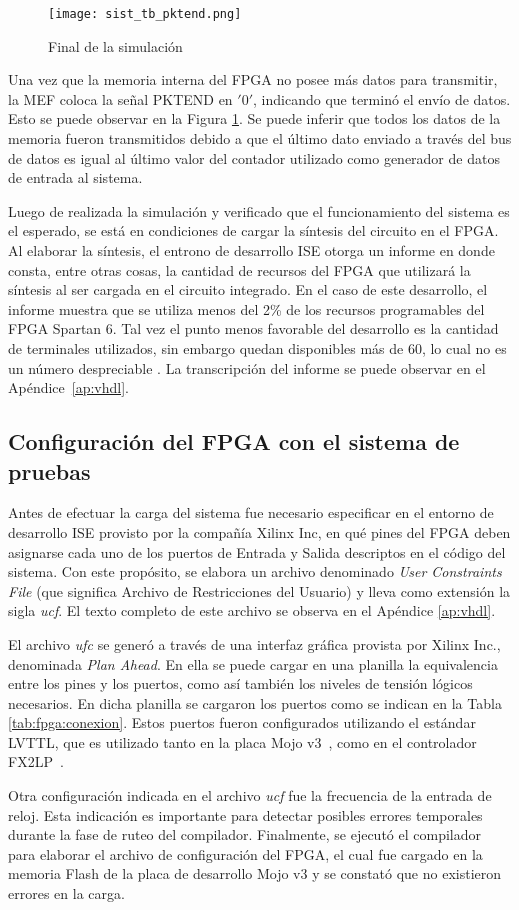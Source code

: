 	\begin{figure}[b]
		\centering
		\texttt{[image: sist\_tb\_pktend.png]}
		\caption{Final de la simulación}
		\label{test:tb:pktend}
	\end{figure}

	Una vez que la memoria interna del FPGA no posee más datos para transmitir, la MEF coloca la señal PKTEND en $'0'$, indicando que terminó el envío de datos. Esto se puede observar en la Figura \ref{test:tb:pktend}. Se puede inferir que todos los datos de la memoria fueron transmitidos debido a que el último dato enviado a través del bus de datos es igual al último valor del contador utilizado como generador de datos de entrada al sistema. 
	
	Luego de realizada la simulación y verificado que el funcionamiento del sistema es el esperado, se está en condiciones de cargar la síntesis del circuito en el FPGA. Al elaborar la síntesis, el entrono de desarrollo ISE otorga un informe en donde consta, entre otras cosas, la cantidad de recursos del FPGA que utilizará la síntesis al ser cargada en el circuito integrado. En el caso de este desarrollo, el informe muestra que se utiliza menos del 2\% de los recursos programables del FPGA Spartan 6. Tal vez el punto menos favorable del desarrollo es la cantidad de terminales utilizados, sin embargo quedan disponibles más de 60, lo cual no es un número despreciable . La transcripción del informe se puede observar en el Apéndice~\ref{ap:vhdl}. 
		
\subsection{Configuración del FPGA con el sistema de pruebas}
	Antes de efectuar la carga del sistema fue necesario especificar en el entorno de desarrollo ISE provisto por la compañía Xilinx Inc, en qué pines del FPGA deben asignarse cada uno de los puertos de Entrada y Salida descriptos en el código del sistema. Con este propósito, se elabora un archivo denominado \textit{User Constraints File} (que significa Archivo de Restricciones del Usuario) y lleva como extensión la sigla \textit{ucf}. El texto completo de este archivo se observa en el Apéndice \ref{ap:vhdl}.
	
	El archivo \textit{ufc} se generó a través de una interfaz gráfica provista por Xilinx Inc., denominada \textit{Plan Ahead}. En ella se puede cargar en una planilla la equivalencia entre los pines y los puertos, como así también los niveles de tensión lógicos necesarios. En dicha planilla se cargaron los puertos como se indican en la Tabla \ref{tab:fpga:conexion}. Estos puertos fueron configurados utilizando el estándar LVTTL, que es utilizado tanto en la placa Mojo v3~\cite{Mojo}, como en el controlador FX2LP~\cite{Cypress2017}.
	
	Otra configuración indicada en el archivo \textit{ucf} fue la frecuencia de la entrada de reloj. Esta indicación es importante para detectar posibles errores temporales durante la fase de ruteo del compilador. Finalmente, se ejecutó el compilador para elaborar el archivo de configuración del FPGA, el cual fue cargado en la memoria Flash de la placa de desarrollo Mojo v3 y se constató que no existieron errores en la carga.
	